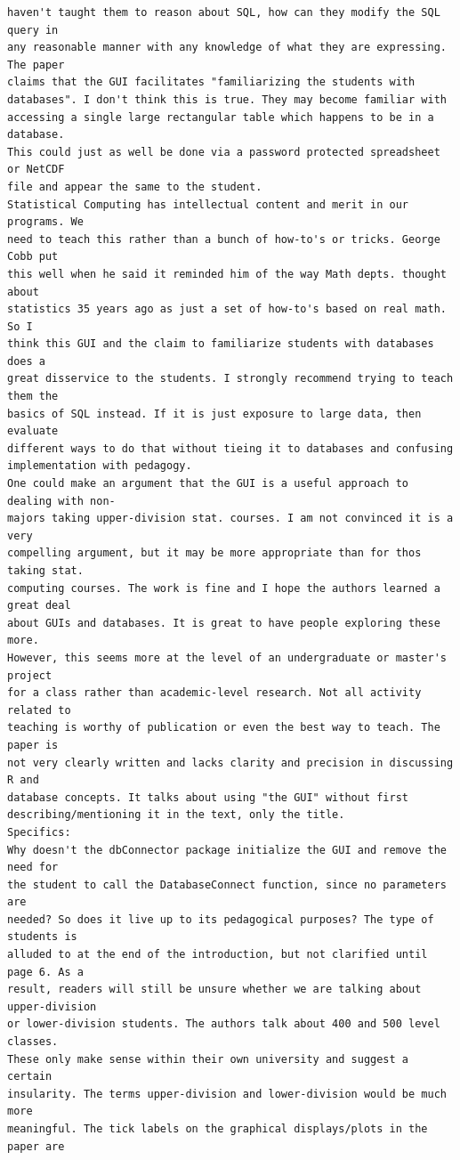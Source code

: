 \documentclass[11pt]{tise_style}
\begin{document}
\begin{verbatim}
haven't taught them to reason about SQL, how can they modify the SQL query in
any reasonable manner with any knowledge of what they are expressing. The paper
claims that the GUI facilitates "familiarizing the students with
databases". I don't think this is true. They may become familiar with
accessing a single large rectangular table which happens to be in a database.
This could just as well be done via a password protected spreadsheet or NetCDF
file and appear the same to the student.
Statistical Computing has intellectual content and merit in our programs. We
need to teach this rather than a bunch of how-to's or tricks. George Cobb put
this well when he said it reminded him of the way Math depts. thought about
statistics 35 years ago as just a set of how-to's based on real math. So I
think this GUI and the claim to familiarize students with databases does a
great disservice to the students. I strongly recommend trying to teach them the
basics of SQL instead. If it is just exposure to large data, then evaluate
different ways to do that without tieing it to databases and confusing
implementation with pedagogy.
One could make an argument that the GUI is a useful approach to dealing with non-
majors taking upper-division stat. courses. I am not convinced it is a very
compelling argument, but it may be more appropriate than for thos taking stat.
computing courses. The work is fine and I hope the authors learned a great deal
about GUIs and databases. It is great to have people exploring these more.
However, this seems more at the level of an undergraduate or master's project
for a class rather than academic-level research. Not all activity related to
teaching is worthy of publication or even the best way to teach. The paper is
not very clearly written and lacks clarity and precision in discussing R and
database concepts. It talks about using "the GUI" without first
describing/mentioning it in the text, only the title.
Specifics:
Why doesn't the dbConnector package initialize the GUI and remove the need for
the student to call the DatabaseConnect function, since no parameters are
needed? So does it live up to its pedagogical purposes? The type of students is
alluded to at the end of the introduction, but not clarified until page 6. As a
result, readers will still be unsure whether we are talking about upper-division
or lower-division students. The authors talk about 400 and 500 level classes.
These only make sense within their own university and suggest a certain
insularity. The terms upper-division and lower-division would be much more
meaningful. The tick labels on the graphical displays/plots in the paper are

\end{verbatim}
\end{document}

